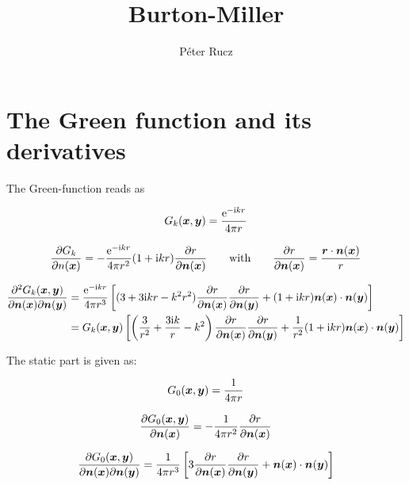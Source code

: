 \documentclass[a4paper, 10pt]{article}
\author{Péter Rucz}
\title{Burton-Miller}
\newcommand{\te}{\mathrm{e}}
\newcommand{\ti}{\mathrm{i}}
\newcommand{\tn}{\bm{\mathnormal{n}}}
\newcommand{\tr}{\bm{\mathnormal{r}}}
\newcommand{\tx}{\bm{\mathnormal{x}}}
\newcommand{\ty}{\bm{\mathnormal{y}}}
\begin{document}
\maketitle

\section{The Green function and its derivatives}

The Green-function reads as

\begin{equation}
	G_k(\tx, \ty) = \frac{\te^{-\ti k r}}{4 \pi r}
\end{equation}

\begin{equation}
	\frac{\partial G_k}{\partial n(\tx)} = -\frac{\te^{-\ti k r}}{4 \pi r^2}(1 + \ti kr)\frac{\partial r}{\partial \tn(\tx)} \qquad \text{with} \qquad \frac{\partial r}{\partial \tn(\tx)} = \frac{\tr \cdot \tn(\tx)}{r}
\end{equation}


\begin{align}
	\frac{\partial^2 G_k(\tx, \ty)}{\partial \tn(\tx) \partial \tn(\ty)}
	&= \frac{\te^{- \ti kr}}{4 \pi r^3}\left[(3 + 3 \ti kr - k^2 r^2) \frac{\partial r}{\partial \tn(\tx)}\frac{\partial r}{\partial \tn(\ty)} + (1 + \ti kr) \tn(\tx) \cdot \tn (\ty) \right] \\
	&= G_k(\tx,\ty)\left[\left(\frac{3}{r^2} + \frac{3\ti k}{r} - k^2\right) \frac{\partial r}{\partial \tn(\tx)}\frac{\partial r}{\partial \tn(\ty)}
	+ \frac{1}{r^2}(1 + \ti kr) \tn(\tx) \cdot \tn (\ty) \right]
\end{align}

The static part is given as:

\begin{equation}
	G_0(\tx, \ty) = \frac{1}{4\pi r}
\end{equation}

\begin{equation}
	\frac{\partial G_0(\tx, \ty)}{\partial \tn(\tx)} = -\frac{1}{4\pi r^2} \frac{\partial r}{\partial \tn(\tx)}
\end{equation}

\begin{equation}
	\frac{\partial G_0(\tx, \ty)}{\partial \tn(\tx) \partial \tn(\ty)} = \frac{1}{4 \pi r^3} \left[3 \frac{\partial r}{\partial \tn(\tx)}\frac{\partial r}{\partial \tn(\ty)} + \tn(\tx) \cdot \tn (\ty) \right]
\end{equation}
\end{document}
